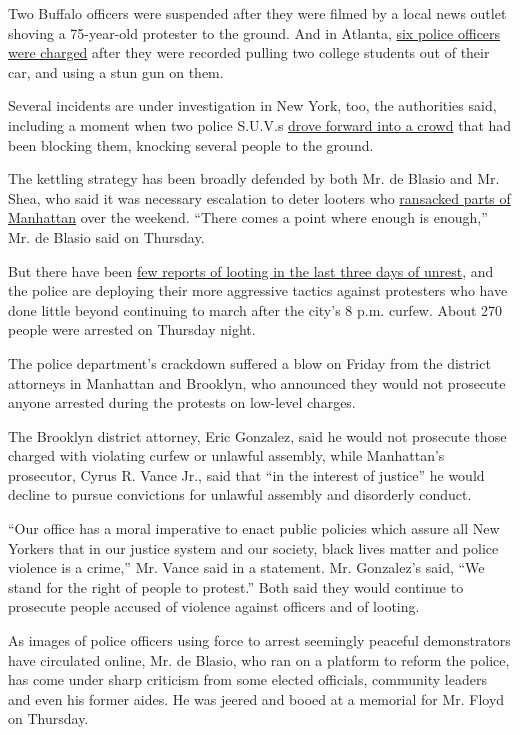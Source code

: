 Two Buffalo officers were suspended after they were filmed by a local
news outlet shoving a 75-year-old protester to the ground. And in
Atlanta,
\href{https://abcnews.go.com/US/wireStory/officers-charged-college-students-pulled-car-71022535}{six
police officers were charged} after they were recorded pulling two
college students out of their car, and using a stun gun on them.

Several incidents are under investigation in New York, too, the
authorities said, including a moment when two police S.U.V.s
\href{https://twitter.com/pgarapon/status/1266885414016688134}{drove
forward into a crowd} that had been blocking them, knocking several
people to the ground.

The kettling strategy has been broadly defended by both Mr. de Blasio
and Mr. Shea, who said it was necessary escalation to deter looters who
\href{https://www.nytimes3xbfgragh.onion/2020/06/02/nyregion/nyc-looting-protests.html}{ransacked
parts of Manhattan} over the weekend. ``There comes a point where enough
is enough,'' Mr. de Blasio said on Thursday.

But there have been
\href{https://www.nytimes3xbfgragh.onion/2020/06/05/nyregion/nyc-protests-george-floyd.html}{few
reports of looting in the last three days of unrest}, and the police are
deploying their more aggressive tactics against protesters who have done
little beyond continuing to march after the city's 8 p.m. curfew. About
270 people were arrested on Thursday night.

The police department's crackdown suffered a blow on Friday from the
district attorneys in Manhattan and Brooklyn, who announced they would
not prosecute anyone arrested during the protests on low-level charges.

The Brooklyn district attorney, Eric Gonzalez, said he would not
prosecute those charged with violating curfew or unlawful assembly,
while Manhattan's prosecutor, Cyrus R. Vance Jr., said that ``in the
interest of justice'' he would decline to pursue convictions for
unlawful assembly and disorderly conduct.

``Our office has a moral imperative to enact public policies which
assure all New Yorkers that in our justice system and our society, black
lives matter and police violence is a crime,'' Mr. Vance said in a
statement. Mr. Gonzalez's said, ``We stand for the right of people to
protest.'' Both said they would continue to prosecute people accused of
violence against officers and of looting.

As images of police officers using force to arrest seemingly peaceful
demonstrators have circulated online, Mr. de Blasio, who ran on a
platform to reform the police, has come under sharp criticism from some
elected officials, community leaders and even his former aides. He was
jeered and booed at a memorial for Mr. Floyd on Thursday.

